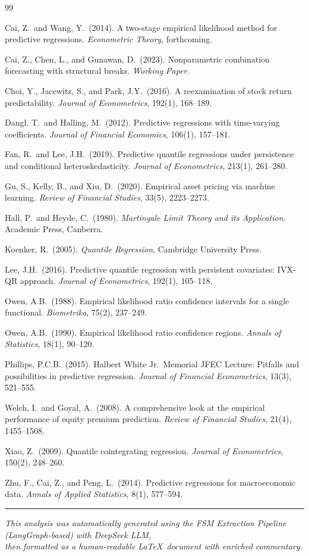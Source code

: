 \documentclass[11pt,a4paper]{article}
\theoremstyle{definition}
\theoremstyle{remark}
\begin{document}
\begin{thebibliography}{99}

Cai, Z.\ and Wang, Y.\ (2014).
A two-stage empirical likelihood method for predictive regressions.
\textit{Econometric Theory}, forthcoming.

Cai, Z., Chen, L., and Gunawan, D.\ (2023).
Nonparametric combination forecasting with structural breaks.
\textit{Working Paper}.

Choi, Y., Jacewitz, S., and Park, J.Y.\ (2016).
A reexamination of stock return predictability.
\textit{Journal of Econometrics}, 192(1), 168--189.

Dangl, T.\ and Halling, M.\ (2012).
Predictive regressions with time-varying coefficients.
\textit{Journal of Financial Economics}, 106(1), 157--181.

Fan, R.\ and Lee, J.H.\ (2019).
Predictive quantile regressions under persistence and conditional heteroskedasticity.
\textit{Journal of Econometrics}, 213(1), 261--280.

Gu, S., Kelly, B., and Xiu, D.\ (2020).
Empirical asset pricing via machine learning.
\textit{Review of Financial Studies}, 33(5), 2223--2273.

Hall, P.\ and Heyde, C.\ (1980).
\textit{Martingale Limit Theory and its Application}.
Academic Press, Canberra.

Koenker, R.\ (2005).
\textit{Quantile Regression}.
Cambridge University Press.

Lee, J.H.\ (2016).
Predictive quantile regression with persistent covariates: IVX-QR approach.
\textit{Journal of Econometrics}, 192(1), 105--118.

Owen, A.B.\ (1988).
Empirical likelihood ratio confidence intervals for a single functional.
\textit{Biometrika}, 75(2), 237--249.

Owen, A.B.\ (1990).
Empirical likelihood ratio confidence regions.
\textit{Annals of Statistics}, 18(1), 90--120.

Phillips, P.C.B.\ (2015).
Halbert White Jr.\ Memorial JFEC Lecture: Pitfalls and possibilities
in predictive regression.
\textit{Journal of Financial Econometrics}, 13(3), 521--555.

Welch, I.\ and Goyal, A.\ (2008).
A comprehensive look at the empirical performance of equity premium prediction.
\textit{Review of Financial Studies}, 21(4), 1455--1508.

Xiao, Z.\ (2009).
Quantile cointegrating regression.
\textit{Journal of Econometrics}, 150(2), 248--260.

Zhu, F., Cai, Z., and Peng, L.\ (2014).
Predictive regressions for macroeconomic data.
\textit{Annals of Applied Statistics}, 8(1), 577--594.

\end{thebibliography}

\medskip
\noindent\rule{\textwidth}{0.4pt}
\begin{center}
\small\textit{This analysis was automatically generated using the FSM Extraction Pipeline
(LangGraph-based) with DeepSeek LLM,}\\
\small\textit{then formatted as a human-readable \LaTeX\ document with enriched commentary.}
\end{center}
\end{document}
